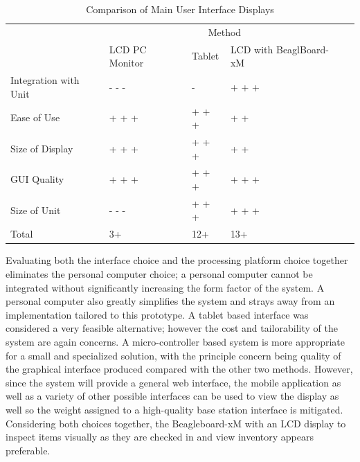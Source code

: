 \documentclass[11pt,letterpaper]{article}
\begin{document}
\begin{table}[h!]
\caption{Comparison of Main User Interface Displays}
\begin{tabular}{| p{2in} | p{1in} | p{1.5in} | p{1.5in} | p{1.5in} |}
\cline{2-4}
\multicolumn{1}{c}{}&\multicolumn{3}{|c|}{Method} \\
\cline{2-4}
\multicolumn{1}{c|}{}&LCD PC \newline Monitor&Tablet&LCD with \newline BeaglBoard-xM\\
\hline
Integration with Unit&- - -&-&+ + +\\
\hline
Ease of Use&+ + +&+ + +&+ +\\
\hline
Size of Display& + + + &+ + +&+ +\\
\hline
GUI Quality&+ + +&+ + +&+ + +\\
\hline
Size of Unit&- - -&+ + +&+ + +\\
\hline
\hline
Total&3+&12+&13+\\
\hline
\end{tabular}
\label{tab:disp}
\end{table}
\noindent Evaluating both the interface choice and the processing platform choice together eliminates the personal computer choice; a personal computer cannot be integrated without significantly increasing the form factor of the system. A personal computer also greatly simplifies the system and strays away from an implementation tailored to this prototype. A tablet based interface was considered a very feasible alternative; however the cost and tailorability of the system are again concerns. A micro-controller based system is more appropriate for a small and specialized solution, with the principle concern being quality of the graphical interface produced compared with the other two methods. However, since the system will provide a general web interface, the mobile application as well as a variety of other possible interfaces can be used to view the display as well so the weight assigned to a high-quality base station interface is mitigated. Considering both choices together, the Beagleboard-xM with an LCD display to inspect items visually as they are checked in and view inventory appears preferable.
\end{document}
